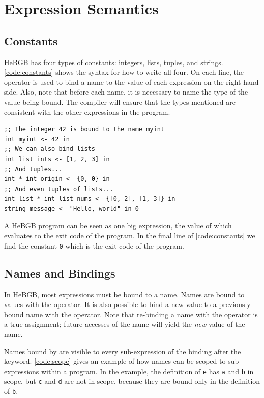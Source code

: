 \documentclass[12pt]{article}
\begin{document}
\section{Expression Semantics}
\subsection{Constants}
HeBGB has four types of constants: integers, lists, tuples, and strings.
\ref{code:constants} shows the syntax for how to write all four. On each
line, the \Term{<-} operator is used to bind a name to the value of each
expression on the right-hand side. Also, note that before each name, it is 
necessary to name the type of the value being bound. The compiler will 
ensure that the types mentioned are consistent with the other expressions 
in the program.
\begin{code_box}
\label{code:constants}
\begin{lstlisting}[language=HeBGB]
;; The integer 42 is bound to the name myint
int myint <- 42 in
;; We can also bind lists
int list ints <- [1, 2, 3] in
;; And tuples...
int * int origin <- {0, 0} in
;; And even tuples of lists...
int list * int list nums <- {[0, 2], [1, 3]} in
string message <- "Hello, world" in 0
\end{lstlisting}
\end{code_box}
A HeBGB program can be seen as one big expression, the value of which
evaluates to the exit code of the program. In the final line of
\ref{code:constants} we find the constant \texttt{0} which is the
exit code of the program.
\subsection{Names and Bindings}
In HeBGB, most expressions must be bound to a name. Names are
bound to values with the \Term{<-} operator. It is also possible to bind
a new value to a previously bound name with the  operator.
Note that re-binding a name with the  operator is a
true assignment; future accesses of the name will yield the \textit{new}
value of the name.

Names bound by \Term{<-} are visible to every sub-expression of the
binding after the  keyword. 
\ref{code:scope} gives an example of how names can be
scoped to sub-expressions within a program. In the example,
the definition of \texttt{e} has \texttt{a} and \texttt{b} in scope,
but \texttt{c} and \texttt{d} are not in scope, because they are
bound only in the definition of \texttt{b}.
\end{document}
